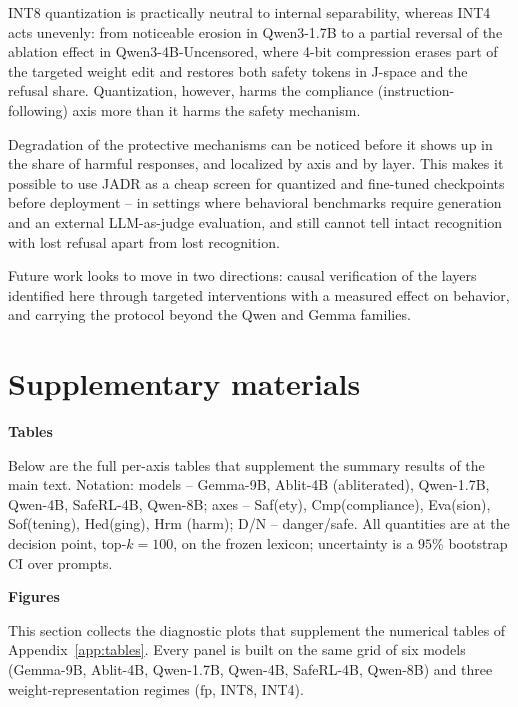 \documentclass[10pt,twocolumn]{article}
\newcommand{\fp}{\mathrm{fp}}
\begin{document}
INT8 quantization is practically neutral to internal separability, whereas INT4 acts unevenly: from noticeable erosion in Qwen3-1.7B to a partial reversal of the ablation effect in Qwen3-4B-Uncensored, where 4-bit compression erases part of the targeted weight edit and restores both safety tokens in J-space and the refusal share. Quantization, however, harms the compliance (instruction-following) axis more than it harms the safety mechanism.

Degradation of the protective mechanisms can be noticed before it shows up in the share of harmful responses, and localized by axis and by layer. This makes it possible to use JADR as a cheap screen for quantized and fine-tuned checkpoints before deployment -- in settings where behavioral benchmarks require generation and an external LLM-as-judge evaluation, and still cannot tell intact recognition with lost refusal apart from lost recognition.

Future work looks to move in two directions: causal verification of the layers identified here through targeted interventions with a measured effect on behavior, and carrying the protocol beyond the Qwen and Gemma families.

\clearpage

\renewcommand{\refname}{References}



\clearpage
\appendix

\section{Supplementary materials}

\textbf{Tables}
\label{app:tables}

Below are the full per-axis tables that supplement the summary results of the main text.
Notation: models -- Gemma-9B, Ablit-4B (abliterated), Qwen-1.7B, Qwen-4B, SafeRL-4B,
Qwen-8B; axes -- Saf(ety), Cmp(compliance), Eva(sion), Sof(tening), Hed(ging), Hrm (harm); D/N
-- danger/safe. All quantities are at the decision point, top-$k=100$, on the frozen lexicon;
uncertainty is a $95\%$ bootstrap CI over prompts.

\textbf{Figures}
\label{app:figures}

This section collects the diagnostic plots that supplement the numerical tables of Appendix~\ref{app:tables}.
Every panel is built on the same grid of six models (Gemma-9B, Ablit-4B, Qwen-1.7B,
Qwen-4B, SafeRL-4B, Qwen-8B) and three weight-representation regimes ($\fp$, INT8, INT4).
\end{document}
